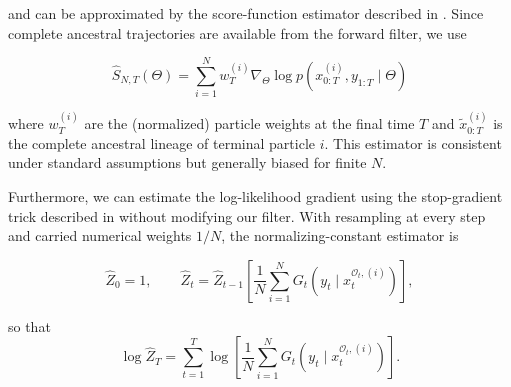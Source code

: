 and can be approximated by the score-function estimator described in \citep{poyiadjisdoucetsingh2011particlescore}. Since complete ancestral trajectories are available from the forward filter, we use

\begin{equation}
    \widehat{S}_{N,T}(\Theta) = \sum_{i=1}^N w_T^{(i)} \nabla_\Theta \log p(x_{0:T}^{(i)}, y_{1:T} \mid \Theta)
\end{equation}

where $w_T^{(i)}$ are the (normalized) particle weights at the final time $T$ and $\widetilde{x}_{0:T}^{(i)}$ is the complete ancestral lineage of terminal particle $i$. This estimator is consistent under standard assumptions but generally biased for finite $N$. 




Furthermore, we can estimate the log-likelihood gradient using the stop-gradient trick described in \citep{scibior2021differentiableparticlefiltering} without modifying our filter. With resampling at every step and carried numerical weights $1/N$, the normalizing-constant estimator is

\begin{equation}
    \widehat Z_0 = 1, \qquad \widehat Z_t = \widehat Z_{t-1} \left[ \frac{1}{N} \sum_{i=1}^N G_t(y_t \mid x_t^{\mathcal{O}_t,(i)}) \right], \nonumber
\end{equation}

so that
\begin{equation}
    \log \widehat Z_T = \sum_{t=1}^T \log \left[ \frac{1}{N} \sum_{i=1}^N G_t(y_t \mid x_t^{\mathcal{O}_t,(i)}) \right]. \nonumber
\end{equation}


